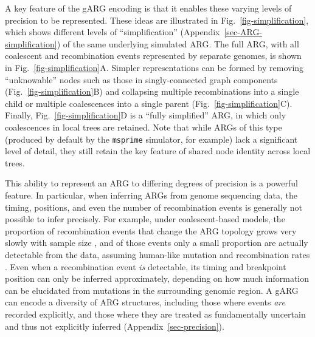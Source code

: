 \documentclass[9pt,twocolumn,twoside]{gsajnl}
\begin{document}
A key feature of the gARG encoding is that it enables these varying levels 
of precision to be represented.
These ideas are illustrated in Fig.~\ref{fig-simplification}, which shows
different levels of ``simplification'' (Appendix~\ref{sec-ARG-simplification})
of the same underlying simulated ARG. The full ARG, with all coalescent and
recombination events represented by separate genomes, is shown in
Fig.~\ref{fig-simplification}A. Simpler representations can be formed by
removing ``unknowable'' nodes such as those in singly-connected graph components (Fig.~\ref{fig-simplification}B) and collapsing
multiple recombinations into a single child or multiple coalescences into a
single parent (Fig.~\ref{fig-simplification}C). 
Finally, Fig.~\ref{fig-simplification}D is a ``fully simplified''
ARG, in which only coalescences in local trees are retained.
Note that while ARGs of this type (produced by default by the \texttt{msprime}
simulator, for example) lack a significant level of detail, they still
retain the key feature of shared node identity across local trees.

This ability to represent an ARG to differing degrees of precision is a powerful
feature. In particular, when inferring ARGs from genome
sequencing data, the timing, positions, and even the number of recombination
events is generally not possible to infer precisely. For example, under
coalescent-based models, the proportion of recombination events that change the
ARG topology grows very slowly with sample size \citep{hein2004gene}, and of those
events only a small proportion are actually detectable from the data, assuming
human-like mutation and recombination
rates \citep{myers2002detection,hayman2023recoverability}.
Even when a recombination event \emph{is} detectable, its timing and breakpoint
position can only be inferred approximately, depending on how much information
can be elucidated from mutations in the surrounding genomic region. 
A gARG can encode a diversity of ARG structures, including 
those where events \emph{are} recorded explicitly, and those where
they are treated as fundamentally uncertain and thus not explicitly inferred (Appendix~\ref{sec-precision}).

\end{document}
